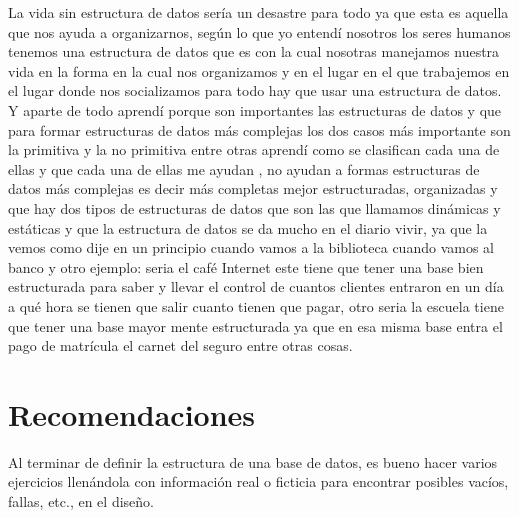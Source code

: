 \documentclass[twoside,twocolumn]{article}
\begin{document}
La vida sin estructura de datos sería un desastre para todo ya que esta es aquella que nos ayuda a organizarnos, según lo que yo entendí nosotros los seres humanos tenemos una estructura de datos que es con la cual nosotras manejamos nuestra vida en la forma en la cual nos organizamos y en el lugar en el que trabajemos en el lugar donde nos socializamos para todo hay que usar una estructura de datos.
Y aparte de todo aprendí porque son importantes las estructuras de datos y que para formar estructuras de datos más complejas los dos casos más importante son la primitiva y la no primitiva entre otras aprendí como se clasifican cada una de ellas y que cada una de ellas me ayudan , no ayudan a formas estructuras de datos más complejas es decir más completas mejor estructuradas, organizadas y que hay dos tipos de estructuras de datos que son las que llamamos dinámicas y estáticas y que la estructura de datos se da mucho en el diario vivir, ya que la vemos como dije en un principio cuando vamos a la biblioteca cuando vamos al banco y otro ejemplo: seria el café Internet este tiene que tener una base bien estructurada para saber y llevar el control de cuantos clientes entraron en un día a qué hora se tienen que salir cuanto tienen que pagar, otro seria la escuela tiene que tener una base mayor mente estructurada ya que en esa misma base entra el pago de matrícula el carnet del seguro entre otras cosas.

\section{Recomendaciones}

Al terminar de definir la estructura de una base de datos, es bueno hacer varios ejercicios llenándola con información real o ficticia para encontrar posibles vacíos, fallas, etc., en el diseño. 
\end{document}
